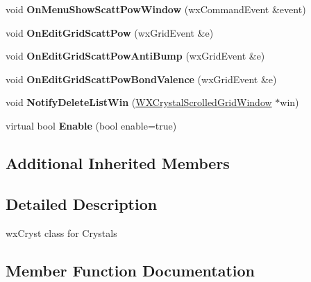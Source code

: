 \begin{DoxyCompactItemize}
\item 
\mbox{\label{class_obj_cryst_1_1_w_x_crystal_ac465646e9c0913dba290a4c7408f55b9}} 
void {\bfseries On\+Menu\+Show\+Scatt\+Pow\+Window} (wx\+Command\+Event \&event)
\item 
\mbox{\label{class_obj_cryst_1_1_w_x_crystal_a64c183898c7dd7c70bbc519c2b702c41}} 
void {\bfseries On\+Edit\+Grid\+Scatt\+Pow} (wx\+Grid\+Event \&e)
\item 
\mbox{\label{class_obj_cryst_1_1_w_x_crystal_ac07a2e102a02f9eb5124251b7a476053}} 
void {\bfseries On\+Edit\+Grid\+Scatt\+Pow\+Anti\+Bump} (wx\+Grid\+Event \&e)
\item 
\mbox{\label{class_obj_cryst_1_1_w_x_crystal_a55c19dde9c0755aae39f70c67333dbb9}} 
void {\bfseries On\+Edit\+Grid\+Scatt\+Pow\+Bond\+Valence} (wx\+Grid\+Event \&e)
\item 
\mbox{\label{class_obj_cryst_1_1_w_x_crystal_a1fce0127f95af7257a3383ba5c3179cc}} 
void {\bfseries Notify\+Delete\+List\+Win} (\mbox{\hyperlink{class_obj_cryst_1_1_w_x_crystal_scrolled_grid_window}{W\+X\+Crystal\+Scrolled\+Grid\+Window}} $\ast$win)
\item 
\mbox{\label{class_obj_cryst_1_1_w_x_crystal_a4250102d9cd2058cb419e69dece4558b}} 
virtual bool {\bfseries Enable} (bool enable=true)
\end{DoxyCompactItemize}
\subsection*{Additional Inherited Members}


\subsection{Detailed Description}
wx\+Cryst class for Crystals 

\subsection{Member Function Documentation}
\mbox{\label{class_obj_cryst_1_1_w_x_crystal_a4b48719679bb8be44eb77a45ac28f4fb}} 
